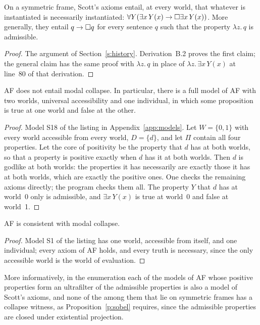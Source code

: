 \documentclass{situationist-preprint}
\begin{document}
\begin{proposition}[Sobel]\label{p:sobel}
On a symmetric frame, Scott's axioms entail, at every world, that whatever is instantiated is necessarily instantiated: $\forall Y(\exists x\,Y(x) \to \mathord{\Box}\exists x\,Y(x))$. More generally, they entail $q \to \mathord{\Box} q$ for every sentence $q$ such that the property $\lambda z.\,q$ is admissible.
\end{proposition}

\begin{proof}
The argument of Section~\ref{s:history}. Derivation~B.2 proves the first claim; the general claim has the same proof with $\lambda z.\,q$ in place of $\lambda z.\,\exists x\,Y(x)$ at line~80 of that derivation.
\end{proof}

\begin{proposition}\label{p:nocollapse}
AF does not entail modal collapse. In particular, there is a full model of AF with two worlds, universal accessibility and one individual, in which some proposition is true at one world and false at the other.
\end{proposition}

\begin{proof}
Model S18 of the listing in Appendix~\ref{app:models}. Let $W = \{0, 1\}$ with every world accessible from every world, $D = \{d\}$, and let $\Pi$ contain all four properties. Let the core of positivity be the property that $d$ has at both worlds, so that a property is positive exactly when $d$ has it at both worlds. Then $d$ is godlike at both worlds: the properties it has necessarily are exactly those it has at both worlds, which are exactly the positive ones. One checks the remaining axioms directly; the program checks them all. The property $Y$ that $d$ has at world~0 only is admissible, and $\exists x\,Y(x)$ is true at world~0 and false at world~1.
\end{proof}

\begin{proposition}\label{p:consistent}
AF is consistent with modal collapse.
\end{proposition}

\begin{proof}
Model S1 of the listing has one world, accessible from itself, and one individual; every axiom of AF holds, and every truth is necessary, since the only accessible world is the world of evaluation.
\end{proof}

More informatively, in the enumeration each of the \csUltra{} models of AF whose positive properties form an ultrafilter of the admissible properties is also a model of Scott's axioms, and none of the \csScottSym{} among them that lie on symmetric frames has a collapse witness, as Proposition~\ref{p:sobel} requires, since the admissible properties are closed under existential projection.
\end{document}
